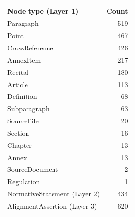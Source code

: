 \begin{tabular}{lr}
\toprule
Node type (Layer 1) & Count \\
\midrule
Paragraph & 519 \\
Point & 467 \\
CrossReference & 426 \\
AnnexItem & 217 \\
Recital & 180 \\
Article & 113 \\
Definition & 68 \\
Subparagraph & 63 \\
SourceFile & 20 \\
Section & 16 \\
Chapter & 13 \\
Annex & 13 \\
SourceDocument & 2 \\
Regulation & 1 \\
\midrule
NormativeStatement (Layer 2) & 434 \\
AlignmentAssertion (Layer 3) & 620 \\
\bottomrule
\end{tabular}
